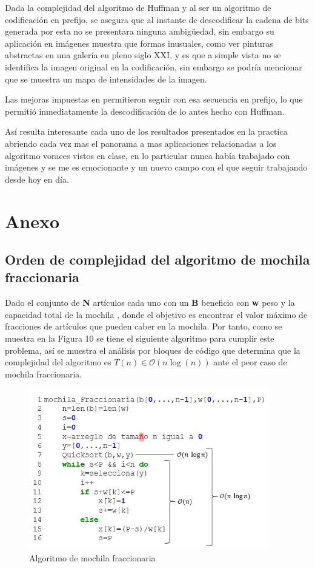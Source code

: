 \documentclass[12pt,twoside]{article}
\begin{document}
    Dada la complejidad del algoritmo de Huffman y al ser un algoritmo de codificaci\'on en prefijo, se asegura que al instante de descodificar la cadena de bits generada por esta no se presentara ninguna ambigüedad, sin embargo su aplicaci\'on en im\'agenes muestra que formas inusuales, como ver pinturas abstractas en una galer\'ia en pleno siglo XXI, y es que a simple vista no se identifica la imagen original en la codificaci\'on, sin embargo se podría mencionar que se muestra un mapa de intensidades de la imagen.
    
    Las mejoras impuestas en permitieron seguir con esa secuencia en prefijo, lo que permiti\'o inmediatamente la descodificaci\'on de lo antes hecho con Huffman.
    
    As\'i resulta interesante cada uno de los resultados presentados en la practica abriendo cada vez mas el panorama a mas aplicaciones relacionadas a los algoritmo voraces vistos en clase, en lo particular nunca hab\'ia trabajado con im\'agenes y se me es emocionante y un nuevo campo con el que seguir trabajando desde hoy en d\'ia.
    
    
    
    \newpage
    \section{Anexo}
    \subsection{Orden de complejidad del algoritmo de mochila fraccionaria}
    Dado el conjunto de {\bf N} art\'iculos cada uno con un {\bf B} beneficio con {\bf w} peso y la capacidad total de la mochila , donde el objetivo es encontrar el valor m\'aximo de fracciones de art\'iculos que pueden caber en la mochila. Por tanto, como se muestra en la Figura 10 se tiene el siguiente algoritmo para cumplir este problema, as\'i se muestra el an\'alisis por bloques de c\'odigo que determina que la complejidad del algoritmo es $T(n)\in\mathcal{O}(n\log(n))$ ante el peor caso de mochila fraccionaria.
    \begin{figure}[H]
        \centering
        \includegraphics[height=7cm]{imagenes/complejidad_mochila.png}
        \caption{Algoritmo de mochila fraccionaria}
    \end{figure}
\end{document}
